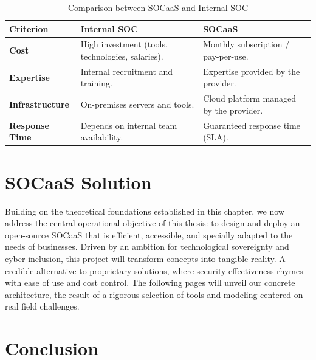 \begin{table}[H]
\centering
\caption{Comparison between SOCaaS and Internal SOC}
\label{tab:socaas-vs-internal}
\renewcommand{\arraystretch}{1.4}
\begin{tabular}{>{\raggedright\arraybackslash}p{3cm} p{5cm} p{5cm}}
\toprule
\rowcolor{tableheader}
\textbf{Criterion} & \textbf{Internal SOC} & \textbf{SOCaaS} \\
\midrule
\textbf{Cost} & High investment (tools, technologies, salaries). & Monthly subscription / pay-per-use. \\
\midrule
\textbf{Expertise} & Internal recruitment and training. & Expertise provided by the provider. \\
\midrule
\textbf{Infrastructure} & On-premises servers and tools. & Cloud platform managed by the provider. \\
\midrule
\textbf{Response Time} & Depends on internal team availability. & Guaranteed response time (SLA). \\
\bottomrule
\end{tabular}
\end{table}

\section{SOCaaS Solution}
\label{sec:socaas-solution}

Building on the theoretical foundations established in this chapter, we now address the central operational objective of this thesis: to design and deploy an open-source SOCaaS that is efficient, accessible, and specially adapted to the needs of businesses. Driven by an ambition for technological sovereignty and cyber inclusion, this project will transform concepts into tangible reality. A credible alternative to proprietary solutions, where security effectiveness rhymes with ease of use and cost control. The following pages will unveil our concrete architecture, the result of a rigorous selection of tools and modeling centered on real field challenges.

\section{Conclusion}
\label{sec:ch2-conclusion}

